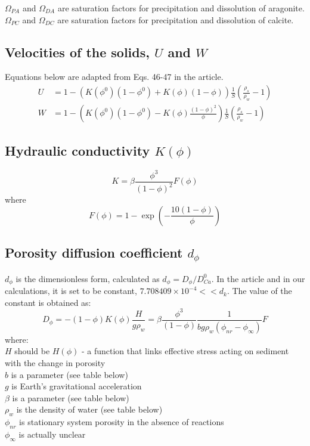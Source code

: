 \documentclass[10pt, letterpaper]{article}
\begin{document}
$\Omega_{PA}$ and $\Omega_{DA}$ are saturation factors for precipitation and dissolution of aragonite. $\Omega_{PC}$ and $\Omega_{DC}$ are saturation factors for precipitation and dissolution of calcite.

\subsection{Velocities of the solids, $U$ and $W$}
Equations below are adapted from Eqs. 46-47 in the article.
\begin{align}
    U &= 1 - \left(K(\phi^0)(1-\phi^0) + K(\phi)(1-\phi)\right) \frac{1}{S}\left(\frac{\rho_s}{\rho_w}-1\right) \nonumber \\
    W &= 1 - \left(K(\phi^0)(1-\phi^0) - K(\phi) \frac{(1-\phi)^2}{\phi}\right)\frac{1}{S}\left(\frac{\rho_s}{\rho_w}-1\right) \nonumber
\end{align}

\subsection{Hydraulic conductivity $K(\phi)$}

\begin{equation}
    K = \beta \frac{\phi^3}{(1 - \phi)^2}F(\phi) \tag{15}
\end{equation}
where
\begin{equation}
    F(\phi) = 1 - \exp\left( -\frac{10(1-\phi)}{\phi} \right) \tag{17}
\end{equation}

\subsection{Porosity diffusion coefficient $d_{\phi}$}
$d_{\phi}$ is the dimensionless form, calculated as $d_{\phi} = D_{\phi}/D_{Ca}^0$. 
In the article and in our calculations, it is set to be constant, $7.708409\times10^{-4} << d_k$. The value of the constant is obtained as:
\begin{equation}
    D_{\phi} = -\left(1 - \phi\right)K(\phi)\frac{H}{g\rho_w} = \beta\frac{\phi^3}{(1 - \phi)}\frac{1}{bg\rho_w(\phi_{nr}-\phi_{\infty})}F \tag{25}
\end{equation}
where:\\
$H$ should be $H(\phi)$ - a function that links effective stress acting on sediment with the change in porosity\\
$b$ is a parameter (see table below)\\
$g$ is Earth's gravitational acceleration\\
$\beta$ is a parameter (see table below)\\
$\rho_w$ is the density of water (see table below)\\
$\phi_{nr}$ is stationary system porosity in the absence of reactions\\
$\phi_{\infty}$ is actually unclear
\end{document}
